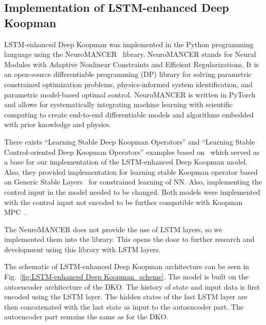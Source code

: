 \documentclass[conference]{IEEEtran}
\begin{document}
\subsection{Implementation of LSTM-enhanced Deep Koopman}
LSTM-enhanced Deep Koopman was implemented in the Python programming language using the NeuroMANCER~\cite{Neuromancer2023} library. NeuroMANCER stands for Neural Modules with Adaptive Nonlinear Constraints and Efficient Regularizations. It is an open-source differentiable programming (DP) library for solving parametric constrained optimization problems, physics-informed system identification, and parametric model-based optimal control. NeuroMANCER is written in PyTorch and allows for systematically integrating machine learning with scientific computing to create end-to-end differentiable models and algorithms embedded with prior knowledge and physics.

There exists ``Learning Stable Deep Koopman Operators'' and ``Learning Stable Control-oriented Deep Koopman Operators'' examples based on~\cite{shi2022deep, korda2020optimal,lusch2018deep} which served as a base for our implementation of the LSTM-enhanced Deep Koopman model. Also, they provided implementation for learning stable Koopman operator based on Generic Stable Layers~\cite{skomski2021constrained, drgovna2022dissipative, zhang2018stabilizing} for constrained learning of NN. Also, implementing the control input in the model needed to be changed. Both models were implemented with the control input not encoded to be further compatible with Koopman MPC~\cite{korda2018linear}.

The NeuroMANCER does not provide the use of LSTM layers, so we implemented them into the library. This opens the door to further research and development using this library with LSTM layers.

The schematic of LSTM-enhanced Deep Koopman architecture can be seen in Fig.~\ref{fig:LSTM-enhanced Deep Koopman_scheme}. The model is built on the autoencoder architecture of the DKO. The history of state and input data is first encoded using the LSTM layer. The hidden states of the last LSTM layer are then concatenated with the last state as input to the autoencoder part. The autoencoder part remains the same as for the DKO.
\end{document}
